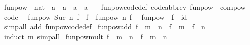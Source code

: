\begin{isabellebody}
\ funpow\ {\isacharcolon}{\kern0pt}{\isacharcolon}{\kern0pt}\ {\isachardoublequoteopen}nat\ {\isasymRightarrow}\ {\isacharparenleft}{\kern0pt}{\isacharprime}{\kern0pt}a\ {\isasymRightarrow}\ {\isacharprime}{\kern0pt}a{\isacharparenright}{\kern0pt}\ {\isasymRightarrow}\ {\isacharprime}{\kern0pt}a\ {\isasymRightarrow}\ {\isacharprime}{\kern0pt}a{\isachardoublequoteclose}\isanewline
\ \ \ funpow{\isacharunderscore}{\kern0pt}code{\isacharunderscore}{\kern0pt}def\ {\isacharbrackleft}{\kern0pt}code{\isacharunderscore}{\kern0pt}abbrev{\isacharbrackright}{\kern0pt}{\isacharcolon}{\kern0pt}\ {\isachardoublequoteopen}funpow\ {\isacharequal}{\kern0pt}\ compow{\isachardoublequoteclose}\isanewline
\isanewline
{}\isamarkupfalse%
\ {\isacharbrackleft}{\kern0pt}code{\isacharbrackright}{\kern0pt}{\isacharcolon}{\kern0pt}\isanewline
\ \ {\isachardoublequoteopen}funpow\ {\isacharparenleft}{\kern0pt}Suc\ n{\isacharparenright}{\kern0pt}\ f\ {\isacharequal}{\kern0pt}\ f\ {\isasymcirc}\ funpow\ n\ f{\isachardoublequoteclose}\isanewline
\ \ {\isachardoublequoteopen}funpow\ {}\ f\ {\isacharequal}{\kern0pt}\ id{\isachardoublequoteclose}\isanewline
%
\isadelimproof
\ \ %
\endisadelimproof
%
\isatagproof
{}\isamarkupfalse%
\ {\isacharparenleft}{\kern0pt}simp{\isacharunderscore}{\kern0pt}all\ add{\isacharcolon}{\kern0pt}\ funpow{\isacharunderscore}{\kern0pt}code{\isacharunderscore}{\kern0pt}def{\isacharparenright}{\kern0pt}%
\endisatagproof
{\isafoldproof}%
%
\isadelimproof
\isanewline
%
\endisadelimproof
\isanewline
{}\isamarkupfalse%
\isanewline
\isanewline
{}\isamarkupfalse%
\ funpow{\isacharunderscore}{\kern0pt}add{\isacharcolon}{\kern0pt}\ {\isachardoublequoteopen}f\ {\isacharcircum}{\kern0pt}{\isacharcircum}{\kern0pt}\ {\isacharparenleft}{\kern0pt}m\ {\isacharplus}{\kern0pt}\ n{\isacharparenright}{\kern0pt}\ {\isacharequal}{\kern0pt}\ f\ {\isacharcircum}{\kern0pt}{\isacharcircum}{\kern0pt}\ m\ {\isasymcirc}\ f\ {\isacharcircum}{\kern0pt}{\isacharcircum}{\kern0pt}\ n{\isachardoublequoteclose}\isanewline
%
\isadelimproof
\ \ %
\endisadelimproof
%
\isatagproof
{}\isamarkupfalse%
\ {\isacharparenleft}{\kern0pt}induct\ m{\isacharparenright}{\kern0pt}\ simp{\isacharunderscore}{\kern0pt}all%
\endisatagproof
{\isafoldproof}%
%
\isadelimproof
\isanewline
%
\endisadelimproof
\isanewline
{}\isamarkupfalse%
\ funpow{\isacharunderscore}{\kern0pt}mult{\isacharcolon}{\kern0pt}\ {\isachardoublequoteopen}{\isacharparenleft}{\kern0pt}f\ {\isacharcircum}{\kern0pt}{\isacharcircum}{\kern0pt}\ m{\isacharparenright}{\kern0pt}\ {\isacharcircum}{\kern0pt}{\isacharcircum}{\kern0pt}\ n\ {\isacharequal}{\kern0pt}\ f\ {\isacharcircum}{\kern0pt}{\isacharcircum}{\kern0pt}\ {\isacharparenleft}{\kern0pt}m\ {\isacharasterisk}{\kern0pt}\ n{\isacharparenright}{\kern0pt}{\isachardoublequoteclose}\isanewline

\end{isabellebody}
